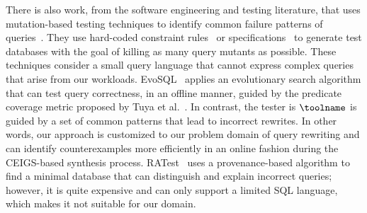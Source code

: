 There is also work, from the software engineering and testing literature, that uses mutation-based testing techniques to identify common failure patterns of queries~\cite{chandra2015data,shah2011generating}. They use hard-coded constraint 
rules~\cite{shah2011generating} or specifications~\cite{chandra2015data} to generate test databases with the goal of killing as many query mutants as possible. These techniques consider a small query language that cannot express complex queries that arise from our workloads.
EvoSQL~\cite{castelein2018search} applies an evolutionary search algorithm that can test query correctness, in an offline manner, guided by the predicate coverage metric proposed by Tuya et al.~\cite{tuya2010full}. 
In contrast, the tester is $\toolname$ is guided by a set of common patterns that lead to incorrect rewrites. 
In other words, our approach is customized to our problem domain of query rewriting and can identify counterexamples more efficiently in an online fashion during the CEIGS-based synthesis process. 
RATest~\cite{miao2019explaining} uses a provenance-based algorithm to find a minimal database that can distinguish and explain incorrect queries; however, it is quite expensive and can only support a limited SQL language, which makes it not suitable for our domain. 

